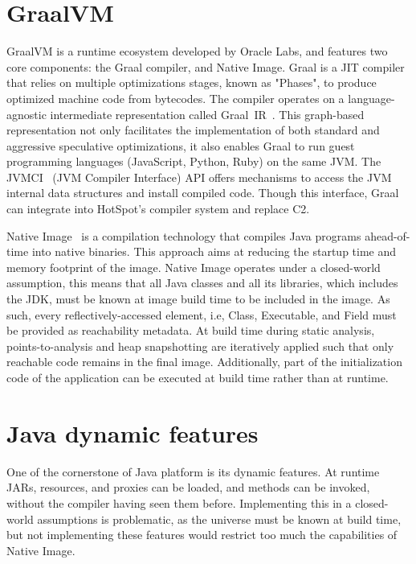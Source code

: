 \section{GraalVM}
GraalVM is a runtime ecosystem developed by Oracle Labs, and features two core components: the Graal compiler, and Native Image.
Graal is a JIT compiler that relies on multiple optimizations stages, known as "Phases", to produce optimized machine code from bytecodes. The compiler operates on a language-agnostic intermediate representation called Graal~IR~\cite{duboscq_graal_nodate}. This graph-based representation not only facilitates the implementation of both standard and aggressive speculative optimizations, it also enables Graal to run guest programming languages (JavaScript, Python, Ruby) on the same JVM. 
The JVMCI~\cite{noauthor_jep_nodate} (JVM Compiler Interface) API offers mechanisms to access the JVM internal data structures and install compiled code. Though this interface, Graal can integrate into HotSpot's compiler system and replace C2. 

Native Image~\cite{noauthor_native_nodate, noauthor_native_nodate-1, wimmer_initialize_2019} is a compilation technology that compiles Java programs ahead-of-time into native binaries. This approach aims at reducing the startup time and memory footprint of the image. Native Image operates under a closed-world assumption, this means that all Java classes and all its libraries, which includes the JDK, must be known at image build time to be included in the image. As such, every reflectively-accessed element, i.e, Class, Executable, and Field must be provided as reachability metadata. 
At build time during static analysis, points-to-analysis and heap snapshotting are iteratively applied such that only reachable code remains in the final image. Additionally, part of the initialization code of the application can be executed at build time rather than at runtime.


\section{Java dynamic features}
One of the cornerstone of Java platform is its dynamic features. At runtime JARs, resources, and proxies can be loaded, and methods can be invoked, without the compiler having seen them before. 
Implementing this in a closed-world assumptions is problematic, as the universe must be known at build time, but not implementing these features would restrict too much the capabilities of Native Image.

